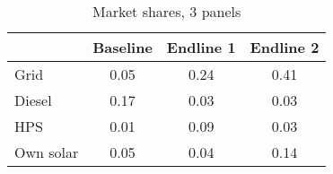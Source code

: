 \begin{table}[htbp]\centering
\caption{Market shares, 3 panels}
\begin{tabular}{l*{3}{c}}
\toprule
                &     Baseline&      Endline 1&     Endline 2\\
\midrule
Grid            &   0.05&    0.24&    0.41\\

Diesel          &    0.17&   0.03&   0.03\\

HPS             &  0.01&   0.09&   0.03\\

Own solar       &   0.05&   0.04&    0.14\\
             
\bottomrule
\end{tabular}
\end{table}
